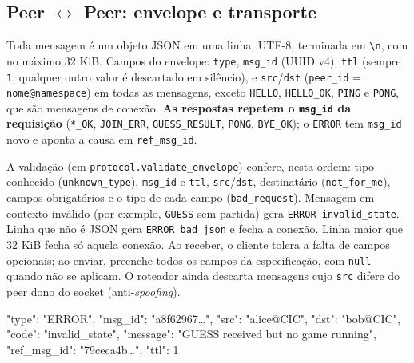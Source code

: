 \documentclass[11pt,a4paper]{article}
\begin{document}
\subsection{Peer \texorpdfstring{$\leftrightarrow$}{<->} Peer: envelope e transporte}
Toda mensagem é um objeto JSON em uma linha, UTF-8, terminada em \texttt{\textbackslash n}, com no máximo 32 KiB. Campos do envelope: \texttt{type}, \texttt{msg\_id} (UUID v4), \texttt{ttl} (sempre \texttt{1}; qualquer outro valor é descartado em silêncio), e \texttt{src}/\texttt{dst} (\texttt{peer\_id} = \texttt{nome@namespace}) em todas as mensagens, exceto \texttt{HELLO}, \texttt{HELLO\_OK}, \texttt{PING} e \texttt{PONG}, que são mensagens de conexão. \textbf{As respostas repetem o \texttt{msg\_id} da requisição} (\texttt{*\_OK}, \texttt{JOIN\_ERR}, \texttt{GUESS\_RESULT}, \texttt{PONG}, \texttt{BYE\_OK}); o \texttt{ERROR} tem \texttt{msg\_id} novo e aponta a causa em \texttt{ref\_msg\_id}.

A validação (em \texttt{protocol.validate\_envelope}) confere, nesta ordem: tipo conhecido (\texttt{unknown\_type}), \texttt{msg\_id} e \texttt{ttl}, \texttt{src}/\texttt{dst}, destinatário (\texttt{not\_for\_me}), campos obrigatórios e o tipo de cada campo (\texttt{bad\_request}). Mensagem em contexto inválido (por exemplo, \texttt{GUESS} sem partida) gera \texttt{ERROR invalid\_state}. Linha que não é JSON gera \texttt{ERROR bad\_json} e fecha a conexão. Linha maior que 32 KiB fecha só aquela conexão. Ao receber, o cliente tolera a falta de campos opcionais; ao enviar, preenche todos os campos da especificação, com \texttt{null} quando não se aplicam. O roteador ainda descarta mensagens cujo \texttt{src} difere do peer dono do socket (anti-\emph{spoofing}).
\begin{codigo}
{
  "type": "ERROR",
  "msg_id": "a8f62967…",
  "src": "alice@CIC",
  "dst": "bob@CIC",
  "code": "invalid_state",
  "message": "GUESS received but no game running",
  "ref_msg_id": "79ceca4b…",
  "ttl": 1
}
\end{codigo}
\end{document}
